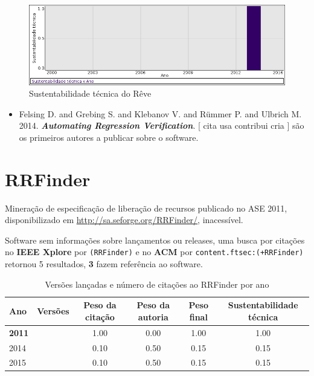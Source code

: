 \begin{figure}[h]
  \center
  \includegraphics[scale=0.50]{imagens/softwares-charts/reve.png}
  \caption{Sustentabilidade técnica do Rêve}
\end{figure}


\begin{itemize}
\item Felsing D. and Grebing S. and Klebanov V. and R\"{u}mmer P. and Ulbrich M.
      2014.
        \textbf{\textit{ Automating Regression Verification}}.
      [
          cita
          usa
          contribui
          cria
      ]
são os primeiros autores a publicar sobre o software.
\end{itemize}
\section{RRFinder}

Mineração de especificação de liberação de recursos
publicado no ASE 2011,
disponibilizado em \url{http://sa.seforge.org/RRFinder/},
inacessível.

Software sem informações sobre lançamentos ou releases,
uma busca por citações no {\bf IEEE Xplore} por
\texttt{(RRFinder)}
e no {\bf ACM} por
\texttt{content.ftsec:(+RRFinder)}
retornou
5 resultados,
{\bf 3} fazem referência ao software.


\begin{table}[H]
\caption{Versões lançadas e número de citações ao RRFinder por ano}
\centering
\begin{tabular}{| l | c | c | c | c | c |}
  \hline
  Ano & Versões & Peso da citação & Peso da autoria & Peso final & Sustentabilidade técnica \\
  \hline
            {\bf 2011}
          &
          
          &
          1.00
          &
          0.00
          &
          1.00
          &
            {\color{blue} 1.00}
          \\
\hline
            2014
          &
          
          &
          0.10
          &
          0.50
          &
          0.15
          &
            {\color{red} 0.15}
          \\
\hline
            2015
          &
          
          &
          0.10
          &
          0.50
          &
          0.15
          &
            {\color{red} 0.15}
          \\
\hline
\end{tabular}
\end{table}


